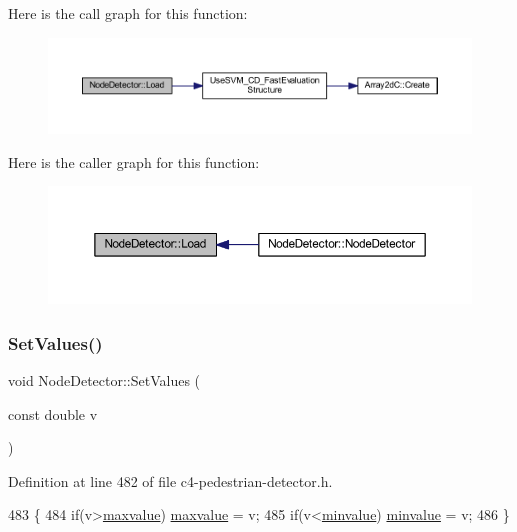 Here is the call graph for this function\+:\nopagebreak
\begin{figure}[H]
\begin{center}
\leavevmode
\includegraphics[width=350pt]{class_node_detector_a8f28d4e33d23c0391511f795615b45d2_cgraph}
\end{center}
\end{figure}
Here is the caller graph for this function\+:\nopagebreak
\begin{figure}[H]
\begin{center}
\leavevmode
\includegraphics[width=350pt]{class_node_detector_a8f28d4e33d23c0391511f795615b45d2_icgraph}
\end{center}
\end{figure}
\mbox{\label{class_node_detector_a23a218ae9b613009bafcda85527a7dd7}} 
\subsubsection{\texorpdfstring{Set\+Values()}{SetValues()}}
{\footnotesize\ttfamily void Node\+Detector\+::\+Set\+Values (\begin{DoxyParamCaption}\item[{const double}]{v }\end{DoxyParamCaption})\hspace{0.3cm}{\ttfamily [inline]}}



Definition at line 482 of file c4-\/pedestrian-\/detector.\+h.


\begin{DoxyCode}
483     \{
484         \textcolor{keywordflow}{if}(v>\mbox{\hyperlink{class_node_detector_adb33cb202a422de76467e72f1b146610}{maxvalue}}) \mbox{\hyperlink{class_node_detector_adb33cb202a422de76467e72f1b146610}{maxvalue}} = v;
485         \textcolor{keywordflow}{if}(v<\mbox{\hyperlink{class_node_detector_ab069f95bc20f00754a15c62c932b7e77}{minvalue}}) \mbox{\hyperlink{class_node_detector_ab069f95bc20f00754a15c62c932b7e77}{minvalue}} = v;
486     \}
\end{DoxyCode}


